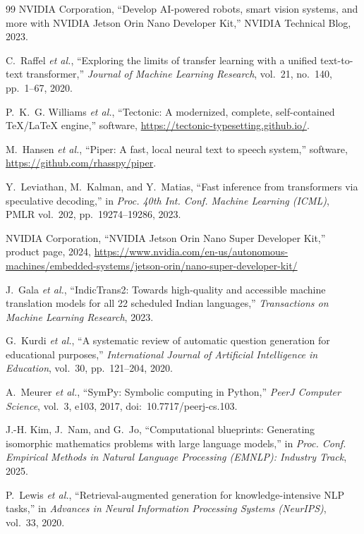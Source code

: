 \documentclass[11pt,a4paper,oneside]{report}
\theoremstyle{definition}
\begin{document}
\begin{thebibliography}{99}
NVIDIA Corporation, ``Develop AI-powered robots, smart vision systems, and more with NVIDIA Jetson Orin Nano Developer Kit,'' NVIDIA Technical Blog, 2023.

C.~Raffel \emph{et al.}, ``Exploring the limits of transfer learning with a unified text-to-text transformer,'' \emph{Journal of Machine Learning Research}, vol.~21, no.~140, pp.~1--67, 2020.

P.~K.~G. Williams \emph{et al.}, ``Tectonic: A modernized, complete, self-contained TeX/LaTeX engine,'' software, \url{https://tectonic-typesetting.github.io/}.

M.~Hansen \emph{et al.}, ``Piper: A fast, local neural text to speech system,'' software, \url{https://github.com/rhasspy/piper}.

Y.~Leviathan, M.~Kalman, and Y.~Matias, ``Fast inference from transformers via speculative decoding,'' in \emph{Proc. 40th Int. Conf. Machine Learning (ICML)}, PMLR vol.~202, pp.~19274--19286, 2023.

NVIDIA Corporation, ``NVIDIA Jetson Orin Nano Super Developer Kit,'' product page, 2024, \url{https://www.nvidia.com/en-us/autonomous-machines/embedded-systems/jetson-orin/nano-super-developer-kit/}

J.~Gala \emph{et al.}, ``IndicTrans2: Towards high-quality and accessible machine translation models for all 22 scheduled Indian languages,'' \emph{Transactions on Machine Learning Research}, 2023.

G.~Kurdi \emph{et al.}, ``A systematic review of automatic question generation for educational purposes,'' \emph{International Journal of Artificial Intelligence in Education}, vol.~30, pp.~121--204, 2020.

A.~Meurer \emph{et al.}, ``SymPy: Symbolic computing in Python,'' \emph{PeerJ Computer Science}, vol.~3, e103, 2017, doi:~10.7717/peerj-cs.103.

J.-H. Kim, J.~Nam, and G.~Jo, ``Computational blueprints: Generating isomorphic mathematics problems with large language models,'' in \emph{Proc. Conf. Empirical Methods in Natural Language Processing (EMNLP): Industry Track}, 2025.

P.~Lewis \emph{et al.}, ``Retrieval-augmented generation for knowledge-intensive NLP tasks,'' in \emph{Advances in Neural Information Processing Systems (NeurIPS)}, vol.~33, 2020.


\end{thebibliography}
\end{document}
